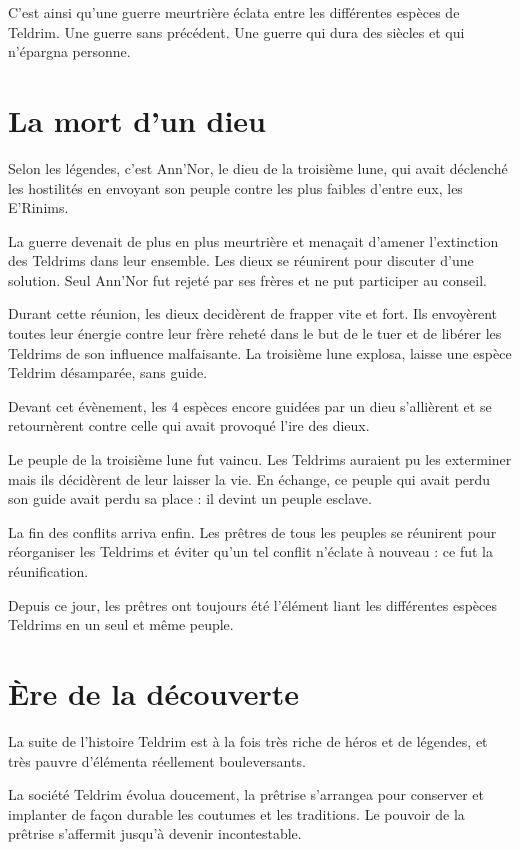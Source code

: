 \begin{multicols}{2}
C’est ainsi qu’une guerre meurtrière éclata entre les différentes espèces de Teldrim. Une guerre sans précédent. Une guerre qui dura des siècles et qui n’épargna personne.

\section{La mort d’un dieu}

Selon les légendes, c’est Ann’Nor, le dieu de la troisième lune, qui avait déclenché les hostilités en envoyant son peuple contre les plus faibles d’entre eux, les E’Rinims. 

La guerre devenait de plus en plus meurtrière et menaçait d’amener l’extinction des Teldrims dans leur ensemble. Les dieux se réunirent pour discuter d’une solution. Seul Ann’Nor fut rejeté par ses frères et ne put participer au conseil.

Durant cette réunion, les dieux decidèrent de frapper vite et fort. Ils envoyèrent toutes leur énergie contre leur frère reheté dans le but de le tuer et de libérer les Teldrims de son influence malfaisante. La troisième lune explosa, laisse une espèce Teldrim désamparée, sans guide.

Devant cet évènement, les 4 espèces encore guidées par un dieu s’allièrent et se retournèrent contre celle qui avait provoqué l’ire des dieux. 

Le peuple de la troisième lune fut vaincu. Les Teldrims auraient pu les exterminer mais ils décidèrent de leur laisser la vie. En échange, ce peuple qui avait perdu son guide avait perdu sa place : il devint un peuple esclave.

La fin des conflits arriva enfin. Les prêtres de tous les peuples se réunirent pour réorganiser les Teldrims et éviter qu’un tel conflit n’éclate à nouveau : ce fut la réunification.

Depuis ce jour, les prêtres ont toujours été l’élément liant les différentes espèces Teldrims en un seul et même peuple.

\section{Ère de la découverte}

La suite de l’histoire Teldrim est à la fois très riche de héros et de légendes, et très pauvre d’élémenta réellement bouleversants. 

La société Teldrim évolua doucement, la prêtrise s’arrangea pour conserver et implanter de façon durable les coutumes et les traditions. Le pouvoir de la prêtrise s’affermit jusqu'à devenir incontestable.


\end{multicols}
